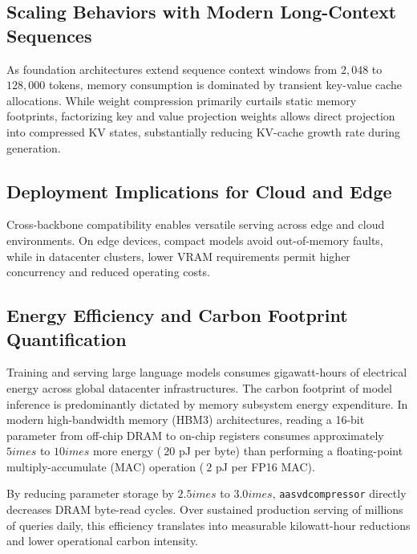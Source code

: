 \subsection{Scaling Behaviors with Modern Long-Context Sequences}
As foundation architectures extend sequence context windows from $2{,}048$ to $128{,}000$ tokens, memory consumption is dominated by transient key-value cache allocations. While weight compression primarily curtails static memory footprints, factorizing key and value projection weights allows direct projection into compressed KV states, substantially reducing KV-cache growth rate during generation.

\subsection{Deployment Implications for Cloud and Edge}
Cross-backbone compatibility enables versatile serving across edge and cloud environments. On edge devices, compact models avoid out-of-memory faults, while in datacenter clusters, lower VRAM requirements permit higher concurrency and reduced operating costs.

\subsection{Energy Efficiency and Carbon Footprint Quantification}
Training and serving large language models consumes gigawatt-hours of electrical energy across global datacenter infrastructures. The carbon footprint of model inference is predominantly dictated by memory subsystem energy expenditure. In modern high-bandwidth memory (HBM3) architectures, reading a 16-bit parameter from off-chip DRAM to on-chip registers consumes approximately $5	imes$ to $10	imes$ more energy ($~20$ pJ per byte) than performing a floating-point multiply-accumulate (MAC) operation ($~2$ pJ per FP16 MAC).

By reducing parameter storage by $2.5	imes$ to $3.0	imes$, \texttt{aasvdcompressor} directly decreases DRAM byte-read cycles. Over sustained production serving of millions of queries daily, this efficiency translates into measurable kilowatt-hour reductions and lower operational carbon intensity.
